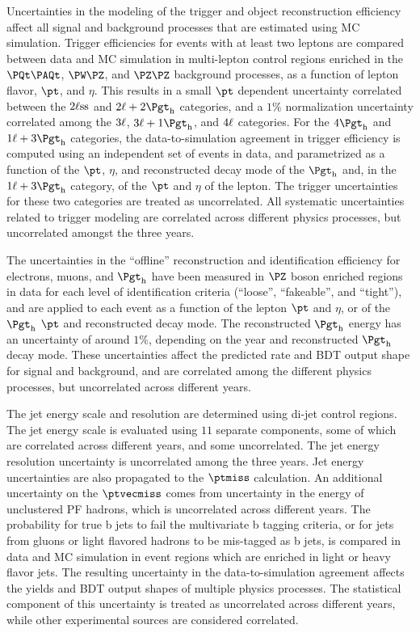 Uncertainties in the modeling of the trigger and object reconstruction efficiency
affect all signal and background processes that are estimated using MC simulation.
Trigger efficiencies for events with at least two leptons are compared between
data and MC simulation in multi-lepton control regions enriched in the $\ttbar$,
$\PW\PZ$, and $\PZ\PZ$ background processes, as a function of lepton flavor,
$\pt$, and $\eta$.
This results in a small $\pt$ dependent uncertainty correlated between the
$2\ell\text{ss}$ and $\lltt$ categories, and a $1\%$ normalization uncertainty
correlated among the $3\ell$, $\lllt$, and $4\ell$ categories.
For the $\noltttt$ and $\lttt$ categories, the data-to-simulation agreement in
trigger efficiency is computed using an independent set of events in data,
and parametrized as a function of the $\pt$, $\eta$, and
reconstructed decay mode of the $\tauh$ and, in the $\lttt$ category, of the $\pt$ and $\eta$ of the lepton. %
The trigger uncertainties for these two categories are treated as uncorrelated.
All systematic uncertainties related to trigger modeling are correlated
across different physics processes, but uncorrelated amongst the three years.

The uncertainties in the ``offline'' reconstruction and identification efficiency for electrons,
muons, and $\tauh$ have been measured in $\PZ$ boson enriched regions in data
for each level of identification criteria (``loose'', ``fakeable'', and ``tight''),
and are applied to each event as a function of the lepton $\pt$ and $\eta$, or of
the $\tauh$ $\pt$ and reconstructed decay mode.
The reconstructed $\tauh$ energy has an uncertainty of around $1\%$, depending on
the year and reconstructed $\tauh$ decay mode.
These uncertainties affect the predicted rate and BDT output shape for signal
and background, and are correlated among the different physics processes, but
uncorrelated across different years.

The jet energy scale and resolution are determined using di-jet control regions. %
The jet energy scale is evaluated using $11$ separate components, some of which
are correlated across different years, and some uncorrelated.
The jet energy resolution uncertainty is uncorrelated among the three years.
Jet energy uncertainties are also propagated to the $\ptmiss$ calculation.
An additional uncertainty on the $\ptvecmiss$ comes from uncertainty in
the energy of unclustered PF hadrons, which is uncorrelated across different years.
The probability for true b jets to fail the multivariate b tagging
criteria, or for jets from gluons or light flavored hadrons to be mis-tagged
as b jets, is compared in data and MC simulation in event regions which
are enriched in light or heavy flavor jets. %
The resulting uncertainty in the data-to-simulation agreement affects the yields
and BDT output shapes of multiple physics processes.
The statistical component of this uncertainty is treated as uncorrelated across
different years, while other experimental sources are considered correlated.

